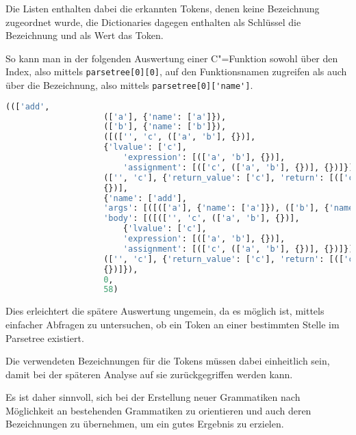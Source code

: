             Die Listen enthalten dabei die erkannten Tokens,
            denen keine Bezeichnung zugeordnet wurde,
            die Dictionaries dagegen enthalten als Schlüssel die Bezeichnung und
            als Wert das Token.

            So kann man in der folgenden Auswertung einer C"=Funktion sowohl
            über den Index,
            also mittels
            \lstinline{parsetree[0][0]},
            auf den Funktionsnamen zugreifen als auch über die Bezeichnung,
            also mittels
            \lstinline{parsetree[0]['name']}.

            \begin{lstlisting}[caption={Repräsentation einer einfachen C-Funktion}, gobble=16, language=python]
                ((['add',
                    (['a'], {'name': ['a']}),
                    (['b'], {'name': ['b']}),
                    ([(['', 'c', (['a', 'b'], {})],
                    {'lvalue': ['c'],
                        'expression': [(['a', 'b'], {})],
                        'assignment': [(['c', (['a', 'b'], {})], {})]}),
                    (['', 'c'], {'return_value': ['c'], 'return': [(['c'], {})]})],
                    {})],
                    {'name': ['add'],
                    'args': [([(['a'], {'name': ['a']}), (['b'], {'name': ['b']})], {})],
                    'body': [([(['', 'c', (['a', 'b'], {})],
                        {'lvalue': ['c'],
                        'expression': [(['a', 'b'], {})],
                        'assignment': [(['c', (['a', 'b'], {})], {})]}),
                    (['', 'c'], {'return_value': ['c'], 'return': [(['c'], {})]})],
                    {})]}),
                    0,
                    58)
            \end{lstlisting}

            Dies erleichtert die spätere Auswertung ungemein,
            da es möglich ist,
            mittels einfacher Abfragen zu untersuchen,
            ob ein Token an einer bestimmten Stelle im Parsetree existiert.

            Die verwendeten Bezeichnungen für die Tokens müssen dabei einheitlich sein,
            damit bei der späteren Analyse auf sie zurückgegriffen werden kann.

            Es ist daher sinnvoll,
            sich bei der Erstellung neuer Grammatiken nach Möglichkeit an bestehenden Grammatiken zu orientieren und
            auch deren Bezeichnungen zu übernehmen,
            um ein gutes Ergebnis zu erzielen.

